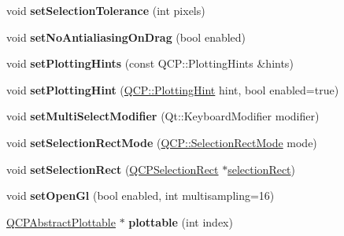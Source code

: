 \begin{DoxyCompactItemize}
\item 
void {\bfseries set\+Selection\+Tolerance} (int pixels)\hypertarget{class_q_custom_plot_a4dc31241d7b09680950e19e5f971ed93}{}\label{class_q_custom_plot_a4dc31241d7b09680950e19e5f971ed93}

\item 
void {\bfseries set\+No\+Antialiasing\+On\+Drag} (bool enabled)\hypertarget{class_q_custom_plot_a775bdcb6329d44701aeaa6135b0e5265}{}\label{class_q_custom_plot_a775bdcb6329d44701aeaa6135b0e5265}

\item 
void {\bfseries set\+Plotting\+Hints} (const Q\+C\+P\+::\+Plotting\+Hints \&hints)\hypertarget{class_q_custom_plot_a94a33cbdadbbac5934843508bcfc210d}{}\label{class_q_custom_plot_a94a33cbdadbbac5934843508bcfc210d}

\item 
void {\bfseries set\+Plotting\+Hint} (\hyperlink{namespace_q_c_p_a5400e5fcb9528d92002ddb938c1f4ef4}{Q\+C\+P\+::\+Plotting\+Hint} hint, bool enabled=true)\hypertarget{class_q_custom_plot_a3b7c97bb6c16464e9e15190c07abe9a9}{}\label{class_q_custom_plot_a3b7c97bb6c16464e9e15190c07abe9a9}

\item 
void {\bfseries set\+Multi\+Select\+Modifier} (Qt\+::\+Keyboard\+Modifier modifier)\hypertarget{class_q_custom_plot_a8fc96e3b5138a06759a2a90c166df516}{}\label{class_q_custom_plot_a8fc96e3b5138a06759a2a90c166df516}

\item 
void {\bfseries set\+Selection\+Rect\+Mode} (\hyperlink{namespace_q_c_p_ac9aa4d6d81ac76b094f9af9ad2d3aacf}{Q\+C\+P\+::\+Selection\+Rect\+Mode} mode)\hypertarget{class_q_custom_plot_a810ef958ebe84db661c7288b526c0deb}{}\label{class_q_custom_plot_a810ef958ebe84db661c7288b526c0deb}

\item 
void {\bfseries set\+Selection\+Rect} (\hyperlink{class_q_c_p_selection_rect}{Q\+C\+P\+Selection\+Rect} $\ast$\hyperlink{class_q_custom_plot_ae64a3994735d8f592a60d9430526a163}{selection\+Rect})\hypertarget{class_q_custom_plot_a0c09f96df15faa4799ad7051bb16cf33}{}\label{class_q_custom_plot_a0c09f96df15faa4799ad7051bb16cf33}

\item 
void {\bfseries set\+Open\+Gl} (bool enabled, int multisampling=16)\hypertarget{class_q_custom_plot_a7db1adc09016329f3aef7c60da935789}{}\label{class_q_custom_plot_a7db1adc09016329f3aef7c60da935789}

\item 
\hyperlink{class_q_c_p_abstract_plottable}{Q\+C\+P\+Abstract\+Plottable} $\ast$ {\bfseries plottable} (int index)\hypertarget{class_q_custom_plot_ad4eeafe213dadabff75db0432277f644}{}\label{class_q_custom_plot_ad4eeafe213dadabff75db0432277f644}


\end{DoxyCompactItemize}
